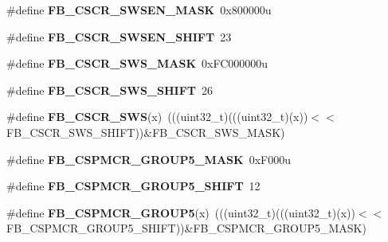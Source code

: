 \begin{DoxyCompactItemize}
\item 
\#define {\bfseries F\+B\+\_\+\+C\+S\+C\+R\+\_\+\+S\+W\+S\+E\+N\+\_\+\+M\+A\+SK}~0x800000u\hypertarget{group__FB__Register__Masks_ga38d5806081b68b58dff2b73abcab4d1a}{}\label{group__FB__Register__Masks_ga38d5806081b68b58dff2b73abcab4d1a}

\item 
\#define {\bfseries F\+B\+\_\+\+C\+S\+C\+R\+\_\+\+S\+W\+S\+E\+N\+\_\+\+S\+H\+I\+FT}~23\hypertarget{group__FB__Register__Masks_gad89987be24118d73c55bf5e97ab5e8d7}{}\label{group__FB__Register__Masks_gad89987be24118d73c55bf5e97ab5e8d7}

\item 
\#define {\bfseries F\+B\+\_\+\+C\+S\+C\+R\+\_\+\+S\+W\+S\+\_\+\+M\+A\+SK}~0x\+F\+C000000u\hypertarget{group__FB__Register__Masks_ga1036d22baaa692a66480d3ef93bc9729}{}\label{group__FB__Register__Masks_ga1036d22baaa692a66480d3ef93bc9729}

\item 
\#define {\bfseries F\+B\+\_\+\+C\+S\+C\+R\+\_\+\+S\+W\+S\+\_\+\+S\+H\+I\+FT}~26\hypertarget{group__FB__Register__Masks_ga1ba720e1700a6ddc15457b55d8fbb376}{}\label{group__FB__Register__Masks_ga1ba720e1700a6ddc15457b55d8fbb376}

\item 
\#define {\bfseries F\+B\+\_\+\+C\+S\+C\+R\+\_\+\+S\+WS}(x)~(((uint32\+\_\+t)(((uint32\+\_\+t)(x))$<$$<$F\+B\+\_\+\+C\+S\+C\+R\+\_\+\+S\+W\+S\+\_\+\+S\+H\+I\+FT))\&F\+B\+\_\+\+C\+S\+C\+R\+\_\+\+S\+W\+S\+\_\+\+M\+A\+SK)\hypertarget{group__FB__Register__Masks_ga8c204c94806499d2bbc6acc6e829e80a}{}\label{group__FB__Register__Masks_ga8c204c94806499d2bbc6acc6e829e80a}

\item 
\#define {\bfseries F\+B\+\_\+\+C\+S\+P\+M\+C\+R\+\_\+\+G\+R\+O\+U\+P5\+\_\+\+M\+A\+SK}~0x\+F000u\hypertarget{group__FB__Register__Masks_ga2c198cc055fa5fd82f9f9441613af96d}{}\label{group__FB__Register__Masks_ga2c198cc055fa5fd82f9f9441613af96d}

\item 
\#define {\bfseries F\+B\+\_\+\+C\+S\+P\+M\+C\+R\+\_\+\+G\+R\+O\+U\+P5\+\_\+\+S\+H\+I\+FT}~12\hypertarget{group__FB__Register__Masks_gaa406022bcdd78d1d96d379efcf539ca7}{}\label{group__FB__Register__Masks_gaa406022bcdd78d1d96d379efcf539ca7}

\item 
\#define {\bfseries F\+B\+\_\+\+C\+S\+P\+M\+C\+R\+\_\+\+G\+R\+O\+U\+P5}(x)~(((uint32\+\_\+t)(((uint32\+\_\+t)(x))$<$$<$F\+B\+\_\+\+C\+S\+P\+M\+C\+R\+\_\+\+G\+R\+O\+U\+P5\+\_\+\+S\+H\+I\+FT))\&F\+B\+\_\+\+C\+S\+P\+M\+C\+R\+\_\+\+G\+R\+O\+U\+P5\+\_\+\+M\+A\+SK)\hypertarget{group__FB__Register__Masks_ga61aeb8bb9251b57140fde249ce7670fa}{}\label{group__FB__Register__Masks_ga61aeb8bb9251b57140fde249ce7670fa}


\end{DoxyCompactItemize}
